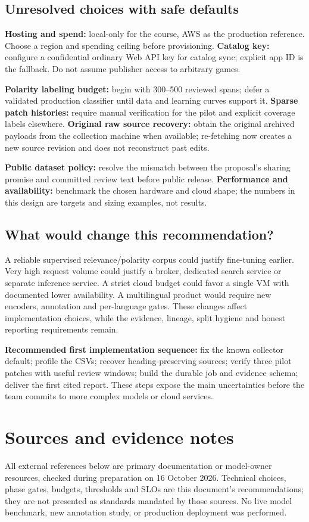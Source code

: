 \documentclass[10pt,letterpaper]{article}
\newcommand{\key}[1]{\textbf{\color{ink}#1}}
\newcommand{\nextsection}[1]{\clearpage\section{#1}}
\begin{document}
\subsection{Unresolved choices with safe defaults}
\key{Hosting and spend:} local-only for the course, AWS as the production reference. Choose a region and spending ceiling before provisioning. \key{Catalog key:} configure a confidential ordinary Web API key for catalog sync; explicit app ID is the fallback. Do not assume publisher access to arbitrary games.

\key{Polarity labeling budget:} begin with 300--500 reviewed spans; defer a validated production classifier until data and learning curves support it. \key{Sparse patch histories:} require manual verification for the pilot and explicit coverage labels elsewhere. \key{Original raw source recovery:} obtain the original archived payloads from the collection machine when available; re-fetching now creates a new source revision and does not reconstruct past edits.

\key{Public dataset policy:} resolve the mismatch between the proposal's sharing promise and committed review text before public release. \key{Performance and availability:} benchmark the chosen hardware and cloud shape; the numbers in this design are targets and sizing examples, not results.

\subsection{What would change this recommendation?}
A reliable supervised relevance/polarity corpus could justify fine-tuning earlier. Very high request volume could justify a broker, dedicated search service or separate inference service. A strict cloud budget could favor a single VM with documented lower availability. A multilingual product would require new encoders, annotation and per-language gates. These changes affect implementation choices, while the evidence, lineage, split hygiene and honest reporting requirements remain.

\key{Recommended first implementation sequence:} fix the known collector default; profile the CSVs; recover heading-preserving sources; verify three pilot patches with useful review windows; build the durable job and evidence schema; deliver the first cited report. These steps expose the main uncertainties before the team commits to more complex models or cloud services.

\nextsection{Sources and evidence notes}
All external references below are primary documentation or model-owner resources, checked during preparation on 16 October 2026. Technical choices, phase gates, budgets, thresholds and SLOs are this document's recommendations; they are not presented as standards mandated by those sources. No live model benchmark, new annotation study, or production deployment was performed.
\end{document}
